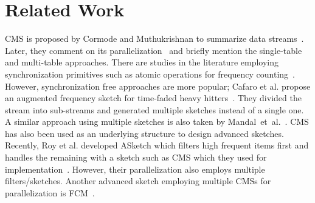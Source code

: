 \documentclass[runningheads]{llncs}
\begin{document}
\begin{table}
\begin{center}
       \caption{\small{Throughputs for sketch generation - million items per second. For each architecture, the number of threads is set to either one or the number of cores.}}
     \label{tab:throughputs}
     \end{center}
     \vspace{-11ex}
\end{table}

\section{Related Work}\label{sec:related}

CMS is proposed by Cormode and Muthukrishnan to summarize data streams~\cite{cormode2005}. Later, they comment on its parallelization~\cite{cormode2012} and briefly mention the single-table and multi-table approaches. There are studies in the literature employing synchronization primitives such as atomic operations for frequency counting~\cite{Das2009}. However, synchronization free approaches are more popular; Cafaro et al. propose an augmented frequency sketch for time-faded heavy hitters~\cite{cafaro2018}. They divided the stream into sub-streams and generated multiple sketches instead of a single one. A similar approach using multiple sketches is also taken by Mandal~et~al.~\cite{mandal18}.  CMS has also been used as an underlying structure to design advanced sketches. Recently, Roy et al. developed ASketch which filters high frequent items first and handles the remaining with a sketch such as CMS which they used for implementation~\cite{roy2016}. However, their parallelization also employs multiple filters/sketches. Another advanced sketch employing multiple CMSs for parallelization is FCM~\cite{Thomas2007}. 
\end{document}
